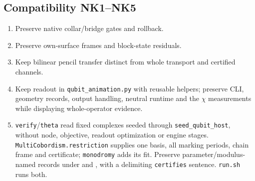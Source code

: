 \documentclass[11pt]{article}
\theoremstyle{definition}
\theoremstyle{remark}
\begin{document}
\subsection{Compatibility NK1--NK5}
\begin{enumerate}[label=NK\arabic*.,leftmargin=*]
\item Preserve native collar/bridge gates and rollback.
\item Preserve own-surface frames and block-state residuals.
\item Keep bilinear pencil transfer distinct from whole transport and certified channels.
\item Keep readout in \texttt{qubit\_animation.py} with reusable helpers;
preserve CLI, geometry records, output handling, neutral runtime and
the $\chi$ measurements while displaying whole-operator evidence.
\item \texttt{verify}/\texttt{theta} read fixed complexes seeded through
\texttt{seed\_qubit\_host}, without node, objective, readout optimization or
engine stages. \texttt{MultiCobordism.restriction} supplies one basis,
all marking periods, chain frame and certificate; \texttt{monodromy} adds
its fit. Preserve parameter/modulus-named records under
 and
, with a delimiting
\texttt{certifies} sentence. \texttt{run.sh} runs both.
\end{enumerate}
\end{document}
